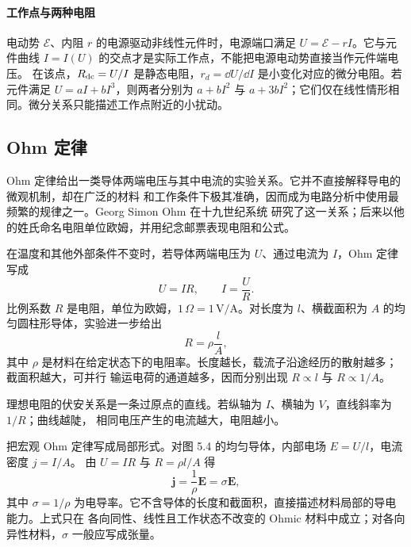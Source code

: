 \paragraph{工作点与两种电阻}
电动势 $\mathcal E$、内阻 $r$ 的电源驱动非线性元件时，电源端口满足 $U=\mathcal E-rI$。它与元件曲线 $I=I(U)$ 的交点才是实际工作点，不能把电源电动势直接当作元件端电压。
在该点，$R_{\rm dc}=U/I$ 是静态电阻，$r_d=\dd U/\dd I$ 是小变化对应的微分电阻。若元件满足 $U=aI+bI^3$，则两者分别为 $a+bI^2$ 与 $a+3bI^2$；它们仅在线性情形相同。微分关系只能描述工作点附近的小扰动。

\subsection*{Ohm 定律}

Ohm 定律给出一类导体两端电压与其中电流的实验关系。它并不直接解释导电的微观机制，却在广泛的材料
和工作条件下极其准确，因而成为电路分析中使用最频繁的规律之一。Georg Simon Ohm 在十九世纪系统
研究了这一关系；后来以他的姓氏命名电阻单位欧姆，并用纪念邮票表现电阻和公式。

\ohmHistoryFigure

在温度和其他外部条件不变时，若导体两端电压为 $U$、通过电流为 $I$，Ohm 定律写成
\begin{equation}
  \boxed{U=IR,\qquad I=\frac UR}.
\end{equation}
比例系数 $R$ 是电阻，单位为欧姆，$1\,\Omega=1\,\mathrm V/\mathrm A$。对长度为 $l$、横截面积为
$A$ 的均匀圆柱形导体，实验进一步给出
\begin{equation}
  \boxed{R=\rho\frac lA},
\end{equation}
其中 $\rho$ 是材料在给定状态下的电阻率。长度越长，载流子沿途经历的散射越多；截面积越大，可并行
输运电荷的通道越多，因而分别出现 $R\propto l$ 与 $R\propto1/A$。

\cylindricalResistorFigure
{}

理想电阻的伏安关系是一条过原点的直线。若纵轴为 $I$、横轴为 $V$，直线斜率为 $1/R$；曲线越陡，
相同电压产生的电流越大，电阻越小。

\ohmicIVFigure
{}

把宏观 Ohm 定律写成局部形式。对图 5.4 的均匀导体，内部电场 $E=U/l$，电流密度 $j=I/A$。
由 $U=IR$ 与 $R=\rho l/A$ 得
\begin{equation}
  \boxed{\boldsymbol j=\frac1\rho\boldsymbol E=\sigma\boldsymbol E},
\end{equation}
其中 $\sigma=1/\rho$ 为电导率。它不含导体的长度和截面积，直接描述材料局部的导电能力。上式只在
各向同性、线性且工作状态不改变的 Ohmic 材料中成立；对各向异性材料，$\sigma$ 一般应写成张量。



